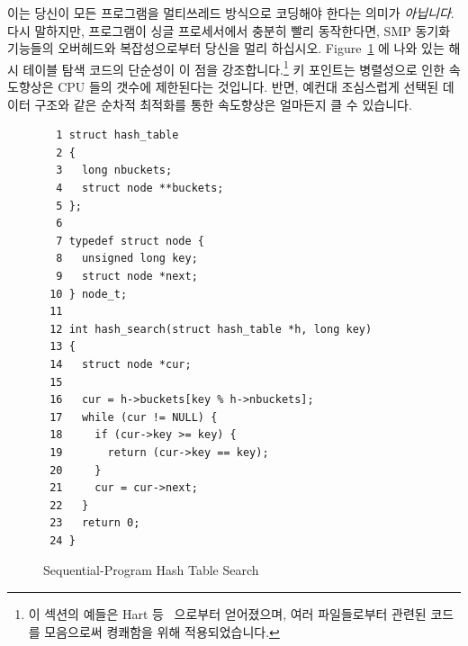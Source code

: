 이는 당신이 모든 프로그램을 멀티쓰레드 방식으로 코딩해야 한다는 의미가
\emph{아닙니다}.
다시 말하지만, 프로그램이 싱글 프로세서에서 충분히 빨리 동작한다면, SMP 동기화
기능들의 오버헤드와 복잡성으로부터 당신을 멀리 하십시오.
Figure~\ref{fig:SMPdesign:Sequential-Program Hash Table Search} 에 나와 있는
해시 테이블 탐색 코드의 단순성이 이 점을 강조합니다.\footnote{
이 섹션의 예들은 Hart 등~\cite{ThomasEHart2006a} 으로부터 얻어졌으며, 여러
	파일들로부터 관련된 코드를 모음으로써 켱쾌함을 위해 적용되었습니다.}
키 포인트는 병렬성으로 인한 속도향상은 CPU 들의 갯수에 제한된다는 것입니다.
반면, 예컨대 조심스럽게 선택된 데이터 구조와 같은 순차적 최적화를 통한
속도향상은 얼마든지 클 수 있습니다.

\begin{figure}[htbp]
{ \scriptsize
\begin{verbatim}
  1 struct hash_table
  2 {
  3   long nbuckets;
  4   struct node **buckets;
  5 };
  6
  7 typedef struct node {
  8   unsigned long key;
  9   struct node *next;
 10 } node_t;
 11
 12 int hash_search(struct hash_table *h, long key)
 13 {
 14   struct node *cur;
 15
 16   cur = h->buckets[key % h->nbuckets];
 17   while (cur != NULL) {
 18     if (cur->key >= key) {
 19       return (cur->key == key);
 20     }
 21     cur = cur->next;
 22   }
 23   return 0;
 24 }
\end{verbatim}
}
\caption{Sequential-Program Hash Table Search}
\label{fig:SMPdesign:Sequential-Program Hash Table Search}
\end{figure}


